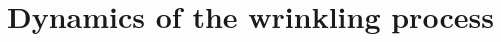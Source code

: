 \documentclass[twocolumn,superscriptaddress,showpacs,preprintnumbers,
amsmath,amssymb,prl]{revtex4-1}
\begin{document}






\section*{Dynamics of the wrinkling process}
\end{document}
